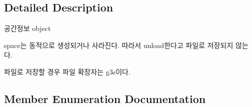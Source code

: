 \subsection{Detailed Description}

\begin{DoxyItemize}
\item 공간정보 object
\item space는 동적으로 생성되거나 사라진다. 따라서 unload한다고 파일로 저장되지 않는다.
\item 파일로 저장할 경우 파일 확장자는 g3s이다. 
\end{DoxyItemize}

\subsection{Member Enumeration Documentation}
\hypertarget{class_c_g_space_ad9e165bcfd44f2d483e7f3e045d6a3c3}{}
